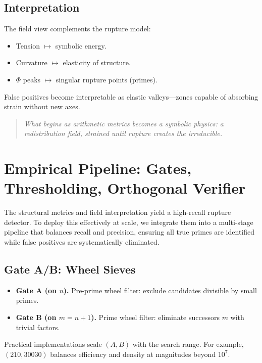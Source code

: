 \documentclass[11pt]{article}
\theoremstyle{plain}
\theoremstyle{definition}
\newcommand{\phidet}{\Phi}                                  %
\begin{document}
\subsection{Interpretation}
The field view complements the rupture model:
\begin{itemize}
  \item Tension $\mapsto$ symbolic energy.  
  \item Curvature $\mapsto$ elasticity of structure.  
  \item $\phidet$ peaks $\mapsto$ singular rupture points (primes).  
\end{itemize}
False positives become interpretable as elastic valleys—zones capable of absorbing strain without new axes.  

\begin{quote}
\emph{What begins as arithmetic metrics becomes a symbolic physics:  
a redistribution field, strained until rupture creates the irreducible.}
\end{quote}

\section{Empirical Pipeline: Gates, Thresholding, Orthogonal Verifier}

The structural metrics and field interpretation yield a high-recall rupture detector. To deploy this effectively at scale, we integrate them into a multi-stage pipeline that balances recall and precision, ensuring all true primes are identified while false positives are systematically eliminated.

\subsection{Gate A/B: Wheel Sieves}
\begin{itemize}
  \item \textbf{Gate A (on $n$).} Pre-prime wheel filter: exclude candidates divisible by small primes.  
  \item \textbf{Gate B (on $m=n+1$).} Prime wheel filter: eliminate successors $m$ with trivial factors.  
\end{itemize}
Practical implementations scale $(A,B)$ with the search range. For example, $(210,30030)$ balances efficiency and density at magnitudes beyond $10^7$.  
\end{document}
